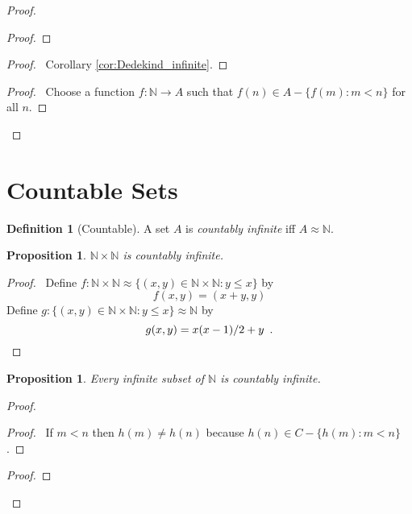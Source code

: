 \documentclass{book}
\let\qed\relax
\newtheorem{prop}[ax]{Proposition}
\theoremstyle{definition}
\newtheorem{df}[ax]{Definition}
\newcommand{\inv}[1]{\ensuremath{{#1}^{-1}}}
\begin{document}
\begin{proof}
\pf
{}
\begin{proof}
	\step{c}{$f \circ s \circ \inv{f} : A \approx A - \{f(0)\}$}
\end{proof}
\begin{proof}
	\pf\ Corollary \ref{cor:Dedekind_infinite}.
\end{proof}
\begin{proof}
	\pf\ Choose a function $f : \mathbb{N} \rightarrow A$ such that $f(n) \in A - \{ f(m) : m < n \}$ for all $n$.
\end{proof}
\qed
\end{proof}

\section{Countable Sets}

\begin{df}[Countable]
A set $A$ is \emph{countably infinite} iff $A \approx \mathbb{N}$.
\end{df}

\begin{prop}
$\mathbb{N} \times \mathbb{N}$ is countably infinite.
\end{prop}

\begin{proof}
\pf\ Define $f : \mathbb{N} \times \mathbb{N} \approx \{ (x,y) \in \mathbb{N} \times \mathbb{N} : y \leq x \}$ by
\[ f(x,y) = (x+y,y) \]
Define $g : \{ (x,y) \in \mathbb{N} \times \mathbb{N} : y \leq x \} \approx \mathbb{N}$ by
\[ g(x,y) = x(x-1)/2 + y \enspace . \qed \]
\end{proof}

\begin{prop}
Every infinite subset of $\mathbb{N}$ is countably infinite.
\end{prop}

\begin{proof}
\pf
{}
\begin{proof}
	\pf\ If $m < n$ then $h(m) \neq h(n)$ because $h(n) \in C - \{ h(m) : m < n \}$.
\end{proof}
\begin{proof}
\end{proof}
\qed
\end{proof}
\end{document}
